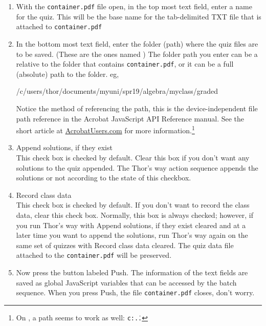 \documentclass{article}
\let\uif\textsf
\begin{document}
\begin{enumerate}
\item With the \texttt{container.pdf} file open, in the top most text field,
    enter a name for the quiz. This will be the base name for the
    tab-delimited TXT file that is attached to \texttt{container.pdf}
\item In the bottom most text field, enter the folder (path) where the quiz files
    are to be saved. (These are the ones named \texttt{})
    The folder path you enter can be a relative to the folder that contains \texttt{container.pdf},
    or it can be a full (absolute) path to the folder. eg,
    \begin{flushleft}\ttfamily
      /c/users/thor/documents/myuni/spr19/algebra/myclass/graded
    \end{flushleft}
    Notice the method of referencing the path, this is the
    device-independent file path reference in the Acrobat JavaScript API Reference manual.
    See the short article at \href{https://acrobatusers.com/tutorials/print/file-paths-acrobat-javascript}{AcrobatUsers.com}
    for more information.\footnote{On , a  path seems to work as well: \texttt{c:\string\users\string\thor\string\...\string\graded}}
\item {} \uif{Append solutions, if they exist}\\
    This check box is checked by default. Clear this box if you don't want
    any solutions to the quiz appended. The \uif{Thor's way} action
    sequence appends the solutions or not according to the state of this
    checkbox.
\item {}
    \uif{Record class data}\\
    This check box is checked by default. If you don't want to record the
    class data, clear this check box. Normally, this box is always checked;
    however, if you run \uif{Thor's way} with \uif{Append solutions, if
    they exist} cleared and at a later time you want to append the
    solutions, run \uif{Thor's way} again on the same set of quizzes with
    \uif{Record class data} cleared. The quiz data file attached to the
    \texttt{container.pdf} will be preserved.
\item Now press the button labeled \textsf{Push}. The information of the
    text fields are saved as global JavaScript variables that can be
    accessed by the batch sequence. When you press \textsf{Push}, the file
    \texttt{container.pdf} closes, don't worry.
\end{enumerate}
\end{document}
